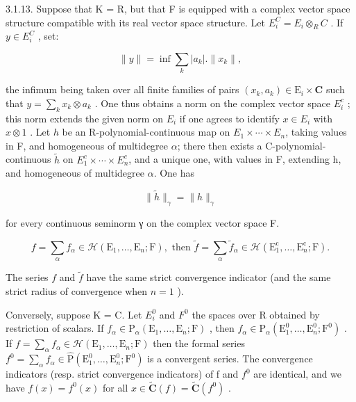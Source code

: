 3.1.13. Suppose that K = R, but that F is equipped with a complex vector space structure compatible with its real vector space structure. Let \(E_{i}^{C} = E_{i} \otimes_{R} C\) . If \(y \in E_{i}^{C}\) , set:

\[
\| y \| = \inf \sum_ {k} | a _ {k} |. \| x _ {k} \|,
\]

the infimum being taken over all finite families of pairs \((x_{k}, a_{k}) \in \mathrm{E}_{i} \times \mathbf{C}\) such that \(y = \sum_{k} x_{k} \otimes a_{k}\) . One thus obtains a norm on the complex vector space \(E_{i}^{c}\) ; this norm extends the given norm on \(E_{i}\) if one agrees to identify \(x \in E_{i}\) with \(x \otimes 1\) . Let \(h\) be an R-polynomial-continuous map on \(E_{1} \times \cdots \times E_{n}\), taking values in F, and homogeneous of multidegree \(\alpha\); there then exists a C-polynomial-continuous \(\tilde{h}\) on \(E_{1}^{c} \times \cdots \times E_{n}^{c}\), and a unique one, with values in F, extending h, and homogeneous of multidegree \(\alpha\). One has

\[
\| \tilde {h} \| _ {\gamma} = \| h \| _ {\gamma}
\]

for every continuous seminorm γ on the complex vector space F.

\[
f = \sum_ {\alpha} f _ {\alpha} \in \mathcal {H} (\mathrm{E} _ {1}, \dots , \mathrm{E} _ {n}; \mathrm{F}), \text {   then   } \tilde {f} = \sum_ {\alpha} \tilde {f} _ {\alpha} \in \mathcal {H} (\mathrm{E} _ {1} ^ {\mathrm{c}}, \dots , \mathrm{E} _ {n} ^ {\mathrm{c}}; \mathrm{F}).
\]

The series \(f\) and \(\tilde{f}\) have the same strict convergence indicator (and the same strict radius of convergence when \(n = 1\) ).

Conversely, suppose K = C. Let \(E_{i}^{0}\) and \(F^{0}\) the spaces over R obtained by restriction of scalars. If \(f_{\alpha} \in \mathrm{P}_{\alpha}(\mathrm{E}_{1}, \ldots, \mathrm{E}_{n}; \mathrm{F})\) , then \(f_{\alpha} \in \mathrm{P}_{\alpha}(\mathrm{E}_{1}^{0}, \ldots, \mathrm{E}_{n}^{0}; \mathrm{F}^{0})\) . If \(f = \sum_{\alpha} f_{\alpha} \in \mathcal{H}(\mathrm{E}_{1}, \ldots, \mathrm{E}_{n}; \mathrm{F})\) then the formal series \(f^{0} = \sum_{\alpha} f_{\alpha} \in \hat{\mathrm{P}}(\mathrm{E}_{1}^{0}, \ldots, \mathrm{E}_{n}^{0}; \mathrm{F}^{0})\) is a convergent series. The convergence indicators (resp. strict convergence indicators) of f and \(f^{0}\) are identical, and we have \(f(x) = f^{0}(x)\) for all \(x \in \tilde{\mathbf{C}}(f) = \tilde{\mathbf{C}}(f^{0})\) .


